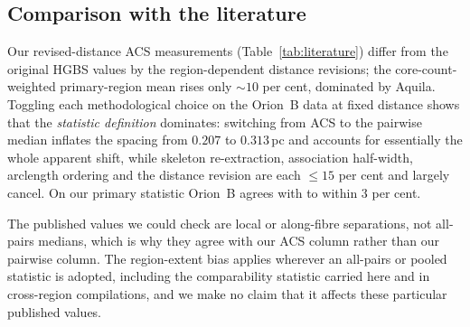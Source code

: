 \documentclass[usenatbib,twoside,twocolumn]{mnras}
\begin{document}
\subsection{Comparison with the literature}

Our revised-distance ACS measurements (Table~\ref{tab:literature}) differ from the original HGBS values by the region-dependent distance revisions; the core-count-weighted primary-region mean rises only $\sim10$ per cent, dominated by Aquila. Toggling each methodological choice on the Orion~B data at fixed distance shows that the \emph{statistic definition} dominates: switching from ACS to the pairwise median inflates the spacing from $0.207$ to $0.313$\,pc and accounts for essentially the whole apparent shift, while skeleton re-extraction, association half-width, arclength ordering and the distance revision are each $\leq15$ per cent and largely cancel. On our primary statistic Orion~B agrees with \citet{Konyves2020} to within $3$ per cent.

The published values we could check are local or along-fibre separations, not all-pairs medians, which is why they agree with our ACS column rather than our pairwise column. The region-extent bias applies wherever an all-pairs or pooled statistic is adopted, including the comparability statistic carried here and in cross-region compilations, and we make no claim that it affects these particular published values.
\end{document}
